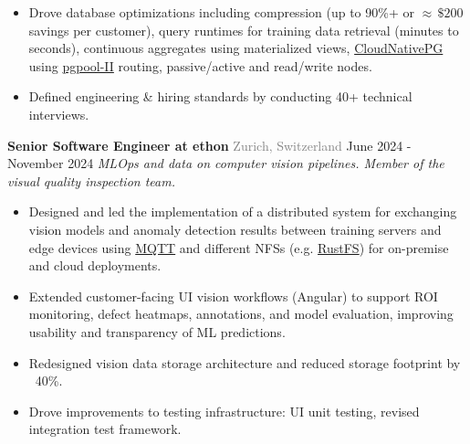 \documentclass{article}
\begin{document}
\begin{flushleft}
\begin{itemize}[label=\raisebox{0.25ex}{\tiny$\bullet$}, leftmargin=1.5em, labelsep=0.3em]
                \item Drove database optimizations including compression (up to 90\%+ or $\approx\,\$200$ savings per customer), query runtimes for training data retrieval (minutes to seconds), continuous aggregates using materialized views, \href{https://github.com/cloudnative-pg/cloudnative-pg}{CloudNativePG} using \href{https://www.postgresql.org/about/news/pgpool-ii-460-is-now-released-3028/}{pgpool-II} routing, passive/active and read/write nodes.
                \item Defined engineering \& hiring standards by conducting 40+ technical interviews.
            \end{itemize}
        \end{flushleft}

        \begin{flushleft}
            \textbf{\large Senior Software Engineer at ethon}
            {\footnotesize \textcolor{gray}{Zurich, Switzerland}} \hfill \small June 2024 - November 2024
            \newline
            \textit{MLOps and data on computer vision pipelines. Member of the visual quality inspection team.}
            \begin{itemize}[label=\raisebox{0.25ex}{\tiny$\bullet$}, leftmargin=1.5em, labelsep=0.3em]
                \item Designed and led the implementation of a distributed system for exchanging vision models and anomaly detection results between training servers and edge devices using \href{https://mqtt.org/}{MQTT} and different NFSs (e.g. \href{https://rustfs.com/}{RustFS}) for on-premise and cloud deployments.
                \item Extended customer-facing UI vision workflows (Angular) to support ROI monitoring, defect heatmaps, annotations, and model evaluation, improving usability and transparency of ML predictions.
                \item Redesigned vision data storage architecture and reduced storage footprint by ~40\%.
                \item Drove improvements to testing infrastructure: UI unit testing, revised integration test framework.
            \end{itemize}
                            \\ [1ex] 
        \end{flushleft}
\end{document}
